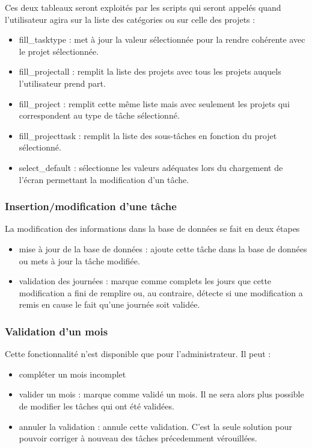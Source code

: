  Ces deux tableaux seront exploités par les scripts qui seront appelés quand l'utilisateur agira sur la liste des catégories ou sur celle des projets :
 \begin{itemize}
  \item{fill\_tasktype} : met à jour la valeur sélectionnée pour la rendre cohérente avec le projet sélectionnée.
  \item{fill\_projectall} : remplit la liste des projets avec tous les projets auquels l'utilisateur prend part.
  \item{fill\_project} : remplit cette même liste mais avec seulement les projets qui correspondent au type de tâche sélectionné.
  \item{fill\_projecttask} : remplit la liste des sous-tâches en fonction du projet sélectionné.
  \item{select\_default} : sélectionne les valeurs adéquates lors du chargement de l'écran permettant la modification d'un tâche.
 \end{itemize}

\subsubsection{Insertion/modification d'une tâche}

 La modification des informations dans la base de données se fait en deux étapes
 \begin{itemize}
  \item{mise à jour de la base de données} :  ajoute cette tâche dans la base de données ou  mets à jour la tâche modifiée.
  \item{validation des journées} :  marque comme complets les jours que cette modification a fini de remplire ou, au contraire, détecte si une modification a remis en cause le fait qu'une journée soit validée.
 \end{itemize}

\subsubsection{Validation d'un mois}

 Cette fonctionnalité n'est disponible que pour l'administrateur. Il peut :
 \begin{itemize}
  \item{compléter un mois incomplet}
  \item{valider un mois} :  marque comme validé un mois. Il ne sera alors plus possible de modifier les tâches qui ont été validées.
  \item{annuler la validation} :  annule cette validation. C'est la seule solution pour pouvoir corriger à nouveau des tâches précedemment vérouillées.
 \end{itemize}
